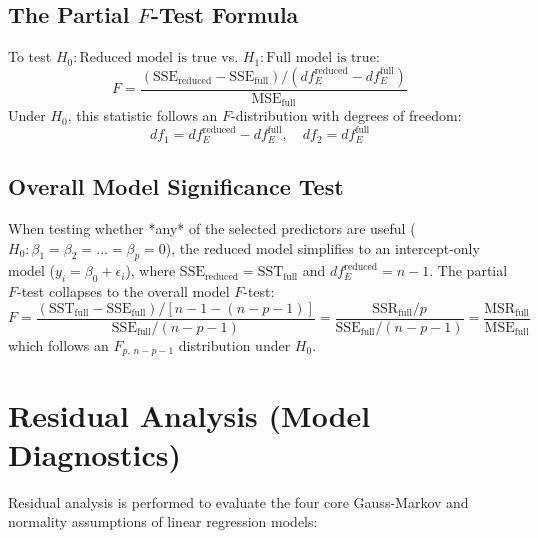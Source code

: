 \documentclass{article}
\begin{document}
\subsection{The Partial $F$-Test Formula}
To test $H_0: \text{Reduced model is true}$ vs. $H_1: \text{Full model is true}$:
$$F = \frac{(\text{SSE}_{\text{reduced}} - \text{SSE}_{\text{full}}) / (df_E^{\text{reduced}} - df_E^{\text{full}})}{\text{MSE}_{\text{full}}}$$
Under $H_0$, this statistic follows an $F$-distribution with degrees of freedom:
$$df_1 = df_E^{\text{reduced}} - df_E^{\text{full}}, \quad df_2 = df_E^{\text{full}}$$

\subsection{Overall Model Significance Test}
When testing whether *any* of the selected predictors are useful ($H_0: \beta_1 = \beta_2 = \dots = \beta_p = 0$), the reduced model simplifies to an intercept-only model ($y_i = \beta_0 + \epsilon_i$), where $\text{SSE}_{\text{reduced}} = \text{SST}_{\text{full}}$ and $df_E^{\text{reduced}} = n-1$. The partial $F$-test collapses to the overall model $F$-test:
$$F = \frac{(\text{SST}_{\text{full}} - \text{SSE}_{\text{full}}) / [n-1 - (n-p-1)]}{\text{SSE}_{\text{full}}/(n-p-1)} = \frac{\text{SSR}_{\text{full}}/p}{\text{SSE}_{\text{full}}/(n-p-1)} = \frac{\text{MSR}_{\text{full}}}{\text{MSE}_{\text{full}}}$$
which follows an $F_{p, \, n-p-1}$ distribution under $H_0$.

\section{Residual Analysis (Model Diagnostics)}

Residual analysis is performed to evaluate the four core Gauss-Markov and normality assumptions of linear regression models:
\end{document}
